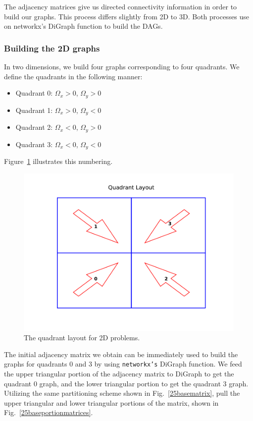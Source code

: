 The adjacency matrices give us directed connectivity information in order to build our graphs. This process differs slightly from 2D to 3D. Both processes use on networkx's DiGraph function to build the DAGs.

\subsubsection{Building the 2D graphs}
In two dimensions, we build four graphs corresponding to four quadrants.
We define the quadrants in the following manner:
\begin{itemize}
  \item Quadrant 0: $\Omega_x > 0$, $\Omega_y > 0$
  \item Quadrant 1: $\Omega_x > 0$, $\Omega_y < 0$
  \item Quadrant 2: $\Omega_x < 0$, $\Omega_y > 0$
  \item Quadrant 3: $\Omega_x < 0$, $\Omega_y < 0$
\end{itemize}
Figure~\ref{quadrant_layout} illustrates this numbering.
\begin{figure}[H]
\centering
\includegraphics{figures/quadrant_layout.pdf}
\caption{The quadrant layout for 2D problems.}
\label{quadrant_layout}
\end{figure}
The initial adjacency matrix we obtain can be immediately used to build the graphs for quadrants 0 and 3 by using {\tt networkx's} DiGraph function.
We feed the upper triangular portion of the adjacency matrix to DiGraph to get the quadrant 0 graph, and the lower triangular portion to get the quadrant 3 graph.
Utilizing the same partitioning scheme shown in Fig.~\ref{25basematrix}, pull the upper triangular and lower triangular portions of the matrix, shown in Fig.~\ref{25baseportionmatrices}.
